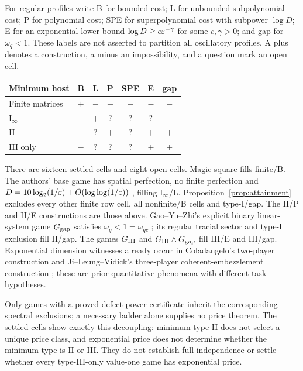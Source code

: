 For regular profiles write B for bounded cost; L for unbounded subpolynomial cost; P for polynomial cost; SPE for superpolynomial cost with subpower $\log D$; E for an exponential lower bound $\log D\ge c\varepsilon^{-\gamma}$ for some $c,\gamma>0$; and gap for $\omega_q<1$. These labels are not asserted to partition all oscillatory profiles. A plus denotes a construction, a minus an impossibility, and a question mark an open cell.
\begin{center}
\begin{tabular}{lcccccc}
\toprule
Minimum host & B & L & P & SPE & E & gap\\
\midrule
Finite matrices & $+$ & $-$ & $-$ & $-$ & $-$ & $-$\\
$\mathrm I_\infty$ & $-$ & $+$ & $?$ & $?$ & $?$ & $-$\\
II & $-$ & $?$ & $+$ & $?$ & $+$ & $+$\\
III only & $-$ & $?$ & $?$ & $?$ & $+$ & $+$\\
\bottomrule
\end{tabular}
\end{center}
There are sixteen settled cells and eight open cells. Magic square fills finite/B. The authors' base game has spatial perfection, no finite perfection and $D=10\log_2(1/\varepsilon)+O(\log\log(1/\varepsilon))$ \cite{Base}, filling $\mathrm I_\infty$/L. Proposition~\ref{prop:attainment} excludes every other finite row cell, all nonfinite/B cells and type-I/gap. The II/P and II/E constructions are those above. Gao--Yu--Zhi's explicit binary linear-system game $G_{\rm gap}$ satisfies $\omega_q<1=\omega_{qc}$ \cite[Theorems 1.1--1.2]{GYZ}; its regular tracial sector and type-I exclusion fill II/gap. The games $G_{\mathrm{III}}$ and $G_{\mathrm{III}}\wedge G_{\rm gap}$ fill III/E and III/gap. Exponential dimension witnesses already occur in Coladangelo's two-player construction \cite{Coladangelo} and Ji--Leung--Vidick's three-player coherent-embezzlement construction \cite{JLV}; these are prior quantitative phenomena with different task hypotheses.

Only games with a proved defect power certificate inherit the corresponding spectral exclusions; a necessary ladder alone supplies no price theorem. The settled cells show exactly this decoupling: minimum type II does not select a unique price class, and exponential price does not determine whether the minimum type is II or III. They do not establish full independence or settle whether every type-III-only value-one game has exponential price.
